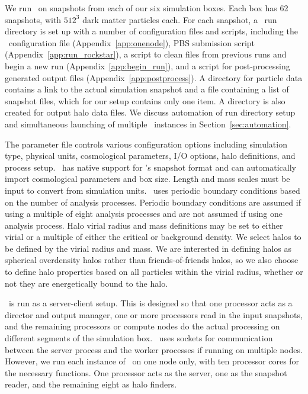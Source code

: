 We run \rockstar\ on snapshots from each of our six simulation boxes.  Each box has 62 snapshots, with $512^{3}$ dark matter particles each.  For each snapshot, a \rockstar\ run directory is set up with a number of configuration files and scripts, including the \rockstar\ configuration file (Appendix~\ref{app:onenode}), PBS submission script (Appendix~\ref{app:run_rockstar}), a script to clean files from previous runs and begin a new run (Appendix~\ref{app:begin_run}), and a script for post-processing generated output files (Appendix~\ref{app:postprocess}).  A directory for particle data contains a link to the actual simulation snapshot and a file containing a list of snapshot files, which for our setup contains only one item.  A directory is also created for output halo data files.  We discuss automation of run directory setup and simultaneous launching of multiple \rockstar\ instances in Section~\ref{sec:automation}.

The parameter file controls various configuration options including simulation type, physical units, cosmological parameters, I/O options, halo definitions, and process setup.  \rockstar\ has native support for \gadget's snapshot format and can automatically import cosmological parameters and box size.  Length and mass scales must be input to convert from simulation units.  \rockstar\ uses periodic boundary conditions based on the number of analysis processes.  Periodic boundary conditions are assumed if using a multiple of eight analysis processes and are not assumed if using one analysis process.  Halo virial radius and mass definitions may be set to either virial or a multiple of either the critical or background density.  We select halos to be defined by the virial radius and mass.  We are interested in defining halos as spherical overdensity halos rather than friends-of-friends halos, so we also choose to define halo properties based on all particles within the virial radius, whether or not they are energetically bound to the halo.

\rockstar\ is run as a server-client setup.  This is designed so that one processor acts as a director and output manager, one or more processors read in the input snapshots, and the remaining processors or compute nodes do the actual processing on different segments of the simulation box.  \rockstar\ uses sockets for communication between the server process and the worker processes if running on multiple nodes.  However, we run each instance of \rockstar\ on one node only, with ten processor cores for the necessary functions.  One processor acts as the server, one as the snapshot reader, and the remaining eight as halo finders.



